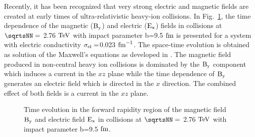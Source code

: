 Recently, it has been recognized that very strong electric and magnetic fields are created at early times of ultra-relativistic heavy-ion collisions. In Fig.~\ref{fig:EMfield}, the time dependence of the magnetic ($\rm B_{y}$) and electric ($\rm E_{x}$) fields in \PbPb collisions at $\sqrtsNN=$ 2.76$~\text{TeV}$ with impact parameter b=9.5$~\text{fm}$ is presented for a system with electric
conductivity $\rm \sigma_{el}=$0.023$~\text{fm}^{-1}$. The space-time evolution is obtained as solution of the Maxwell's equations as developed in \cite{Gursoy:2014aka}. The magnetic field produced in non-central heavy ion collisions is dominated by the $\rm B_{y}$ component which induces a current in the $xz$ plane while the time dependence of $\rm B_{y}$ generates an electric field which is directed in the $x$ direction. The combined effect of both fields is a current in the $xz$ plane.
\begin{figure}
\centering
{}
\caption{Time evolution in the forward rapidity region of the magnetic field $\rm B_{y}$ and electric field $\rm E_{x}$ in \PbPb collisions at $\sqrtsNN=$ 2.76$~\text{TeV}$ with impact parameter b=9.5$~\text{fm}$.}
\label{fig:EMfield}
\end {figure}

